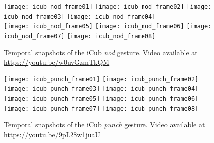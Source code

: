 \begin{figure}
\centering
\subfloat
{\texttt{[image: icub\_nod\_frame01]}} \quad
%
\subfloat
{\texttt{[image: icub\_nod\_frame02]}} \quad
%
\subfloat
{\texttt{[image: icub\_nod\_frame03]}} \quad
%
\subfloat
{\texttt{[image: icub\_nod\_frame04]}} \\
%
\subfloat
{\texttt{[image: icub\_nod\_frame05]}} \quad
%
\subfloat
{\texttt{[image: icub\_nod\_frame06]}} \quad
%
\subfloat
{\texttt{[image: icub\_nod\_frame07]}} \quad
%
\subfloat
{\texttt{[image: icub\_nod\_frame08]}}
\caption[Temporal snapshots of the iCub \emph{nod} gesture.]{Temporal snapshots of the iCub \emph{nod} gesture. Video available at \url{https://youtu.be/w0uvGzmTkQM}}
\label{fig:nod}
\end{figure}

\begin{figure}
\centering
\subfloat
{\texttt{[image: icub\_punch\_frame01]}} \quad
%
\subfloat
{\texttt{[image: icub\_punch\_frame02]}} \quad
%
\subfloat
{\texttt{[image: icub\_punch\_frame03]}} \quad
%
\subfloat
{\texttt{[image: icub\_punch\_frame04]}} \\
%
\subfloat
{\texttt{[image: icub\_punch\_frame05]}} \quad
%
\subfloat
{\texttt{[image: icub\_punch\_frame06]}} \quad
%
\subfloat
{\texttt{[image: icub\_punch\_frame07]}} \quad
%
\subfloat
{\texttt{[image: icub\_punch\_frame08]}}
\caption[Temporal snapshots of the iCub \emph{punch} gesture.]{Temporal snapshots of the iCub \emph{punch} gesture. Video available at \url{https://youtu.be/9pL28w1juaU}}
\label{fig:punch}
\end{figure}

